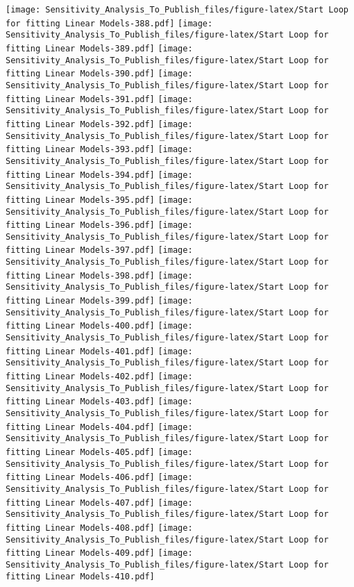 \documentclass[
]{article}
\begin{document}
\texttt{[image: Sensitivity\_Analysis\_To\_Publish\_files/figure-latex/Start Loop for fitting Linear Models-388.pdf]}
\texttt{[image: Sensitivity\_Analysis\_To\_Publish\_files/figure-latex/Start Loop for fitting Linear Models-389.pdf]}
\texttt{[image: Sensitivity\_Analysis\_To\_Publish\_files/figure-latex/Start Loop for fitting Linear Models-390.pdf]}
\texttt{[image: Sensitivity\_Analysis\_To\_Publish\_files/figure-latex/Start Loop for fitting Linear Models-391.pdf]}
\texttt{[image: Sensitivity\_Analysis\_To\_Publish\_files/figure-latex/Start Loop for fitting Linear Models-392.pdf]}
\texttt{[image: Sensitivity\_Analysis\_To\_Publish\_files/figure-latex/Start Loop for fitting Linear Models-393.pdf]}
\texttt{[image: Sensitivity\_Analysis\_To\_Publish\_files/figure-latex/Start Loop for fitting Linear Models-394.pdf]}
\texttt{[image: Sensitivity\_Analysis\_To\_Publish\_files/figure-latex/Start Loop for fitting Linear Models-395.pdf]}
\texttt{[image: Sensitivity\_Analysis\_To\_Publish\_files/figure-latex/Start Loop for fitting Linear Models-396.pdf]}
\texttt{[image: Sensitivity\_Analysis\_To\_Publish\_files/figure-latex/Start Loop for fitting Linear Models-397.pdf]}
\texttt{[image: Sensitivity\_Analysis\_To\_Publish\_files/figure-latex/Start Loop for fitting Linear Models-398.pdf]}
\texttt{[image: Sensitivity\_Analysis\_To\_Publish\_files/figure-latex/Start Loop for fitting Linear Models-399.pdf]}
\texttt{[image: Sensitivity\_Analysis\_To\_Publish\_files/figure-latex/Start Loop for fitting Linear Models-400.pdf]}
\texttt{[image: Sensitivity\_Analysis\_To\_Publish\_files/figure-latex/Start Loop for fitting Linear Models-401.pdf]}
\texttt{[image: Sensitivity\_Analysis\_To\_Publish\_files/figure-latex/Start Loop for fitting Linear Models-402.pdf]}
\texttt{[image: Sensitivity\_Analysis\_To\_Publish\_files/figure-latex/Start Loop for fitting Linear Models-403.pdf]}
\texttt{[image: Sensitivity\_Analysis\_To\_Publish\_files/figure-latex/Start Loop for fitting Linear Models-404.pdf]}
\texttt{[image: Sensitivity\_Analysis\_To\_Publish\_files/figure-latex/Start Loop for fitting Linear Models-405.pdf]}
\texttt{[image: Sensitivity\_Analysis\_To\_Publish\_files/figure-latex/Start Loop for fitting Linear Models-406.pdf]}
\texttt{[image: Sensitivity\_Analysis\_To\_Publish\_files/figure-latex/Start Loop for fitting Linear Models-407.pdf]}
\texttt{[image: Sensitivity\_Analysis\_To\_Publish\_files/figure-latex/Start Loop for fitting Linear Models-408.pdf]}
\texttt{[image: Sensitivity\_Analysis\_To\_Publish\_files/figure-latex/Start Loop for fitting Linear Models-409.pdf]}
\texttt{[image: Sensitivity\_Analysis\_To\_Publish\_files/figure-latex/Start Loop for fitting Linear Models-410.pdf]}
\end{document}
